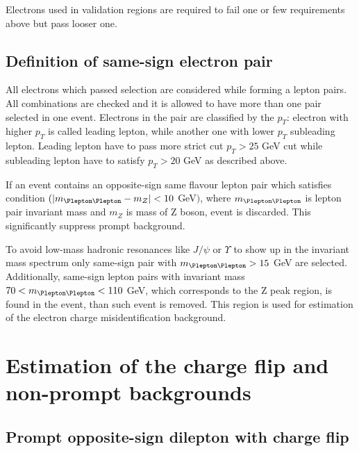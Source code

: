 Electrons used in validation regions are required to fail one or few requirements above but pass looser one.

\subsection{Definition of same-sign electron pair}
All electrons which passed selection are considered while forming a lepton pairs.
All combinations are checked and it is allowed to have more than one pair selected in one event.
Electrons in the pair are classified by the $p_T$: electron with higher $p_T$ is called leading lepton, while another one with lower $p_T$ subleading lepton.
Leading lepton have to pass more strict cut $p_T>25$ GeV cut while subleading lepton have to satisfy $p_T>20$ GeV as described above.

If an event contains an opposite-sign same flavour lepton pair which satisfies condition $( |m_{\Plepton\Plepton} - m_{Z}| < 10$ GeV$)$,
where $m_{\Plepton\Plepton}$ is lepton pair invariant mass and $m_{Z}$ is mass of Z boson, event is discarded.
This significantly suppress prompt background.

To avoid low-mass hadronic resonances like $J/\psi$ or $\varUpsilon$ to show up in the invariant mass spectrum only same-sign pair with $m_{\Plepton\Plepton}>15$ GeV are selected.
Additionally, same-sign lepton pairs with invariant mass $70 < m_{\Plepton\Plepton}< 110$ GeV, which corresponds to the Z peak region, is found in the event, than such event is removed.
This region is used for estimation of the electron charge misidentification background.

\section{Estimation of the charge flip and non-prompt backgrounds}

\subsection{Prompt opposite-sign dilepton with charge flip}
\label{subsec:CF_definition}

